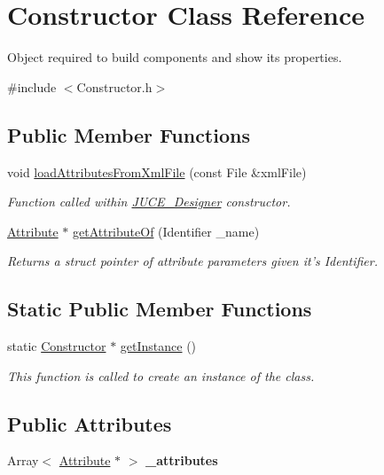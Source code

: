 \hypertarget{class_constructor}{\section{Constructor Class Reference}
\label{class_constructor}
}


Object required to build components and show its properties.  




{\ttfamily \#include $<$Constructor.\-h$>$}

\subsection*{Public Member Functions}
\begin{DoxyCompactItemize}
\item 
void \hyperlink{class_constructor_aa276e1e035578f7964780a2f3453395f}{load\-Attributes\-From\-Xml\-File} (const File \&xml\-File)
\begin{DoxyCompactList}\small\item\em Function called within \hyperlink{class_j_u_c_e___designer}{J\-U\-C\-E\-\_\-\-Designer} constructor. \end{DoxyCompactList}\item 
\hyperlink{struct_attribute}{Attribute} $\ast$ \hyperlink{class_constructor_ab34f1e9062445681a508550415ff18ef}{get\-Attribute\-Of} (Identifier \-\_\-name)
\begin{DoxyCompactList}\small\item\em Returns a struct pointer of attribute parameters given it's Identifier. \end{DoxyCompactList}\end{DoxyCompactItemize}
\subsection*{Static Public Member Functions}
\begin{DoxyCompactItemize}
\item 
static \hyperlink{class_constructor}{Constructor} $\ast$ \hyperlink{class_constructor_a757cc1671f52f15291b89772bef7aa98}{get\-Instance} ()
\begin{DoxyCompactList}\small\item\em This function is called to create an instance of the class. \end{DoxyCompactList}\end{DoxyCompactItemize}
\subsection*{Public Attributes}
\begin{DoxyCompactItemize}
\item 
\hypertarget{class_constructor_ae5d823f5aaef582e23842ee45a001c12}{Array$<$ \hyperlink{struct_attribute}{Attribute} $\ast$ $>$ {\bfseries \-\_\-attributes}}\label{class_constructor_ae5d823f5aaef582e23842ee45a001c12}

\end{DoxyCompactItemize}


